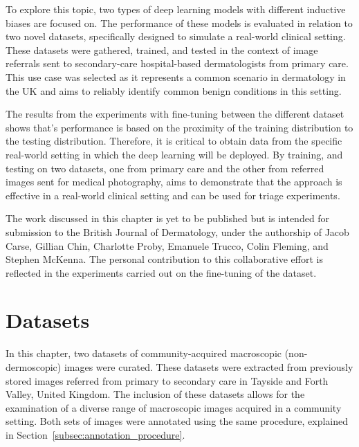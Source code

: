 To explore this topic, two types of deep learning models with different inductive biases are focused on. The performance of these models is evaluated in relation to two novel datasets, specifically designed to simulate a real-world clinical setting. These datasets were gathered, trained, and tested in the context of image referrals sent to secondary-care hospital-based dermatologists from primary care. This use case was selected as it represents a common scenario in dermatology in the UK and aims to reliably identify common benign conditions in this setting.

The results from the experiments with fine-tuning between the different dataset shows that’s performance is based on the proximity of the training distribution to the testing distribution. Therefore, it is critical to obtain data from the specific real-world setting in which the deep learning will be deployed. By training, and testing on two datasets, one from primary care and the other from referred images sent for medical photography, aims to demonstrate that the approach is effective in a real-world clinical setting and can be used for triage experiments.

The work discussed in this chapter is yet to be published but is intended for submission to the British Journal of Dermatology, under the authorship of Jacob Carse, Gillian Chin, Charlotte Proby, Emanuele Trucco, Colin Fleming, and Stephen McKenna. The personal contribution to this collaborative effort is reflected in the experiments carried out on the fine-tuning of the dataset.



\section{Datasets}
\label{sec:generalisation_datasets}
In this chapter, two datasets of community-acquired macroscopic (non-dermoscopic) images were curated. These datasets were extracted from previously stored images referred from primary to secondary care in Tayside and Forth Valley, United Kingdom. The inclusion of these datasets allows for the examination of a diverse range of macroscopic images acquired in a community setting. Both sets of images were annotated using the same procedure, explained in Section~\ref{subsec:annotation_procedure}.

